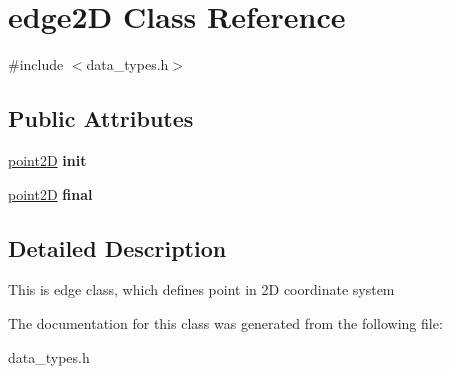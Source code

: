 \hypertarget{classedge2_d}{}\section{edge2D Class Reference}
\label{classedge2_d}


{\ttfamily \#include $<$data\+\_\+types.\+h$>$}

\subsection*{Public Attributes}
\begin{DoxyCompactItemize}
\item 
\mbox{\label{classedge2_d_a836f325bae83890f3d1b90a5c5364a52}} 
\mbox{\hyperlink{classpoint2_d}{point2D}} {\bfseries init}
\item 
\mbox{\label{classedge2_d_ad59d0a6434b1f84d33d8acd0eb0957ce}} 
\mbox{\hyperlink{classpoint2_d}{point2D}} {\bfseries final}
\end{DoxyCompactItemize}


\subsection{Detailed Description}
This is edge class, which defines point in 2D coordinate system 

The documentation for this class was generated from the following file\+:\begin{DoxyCompactItemize}
\item 
data\+\_\+types.\+h\end{DoxyCompactItemize}
